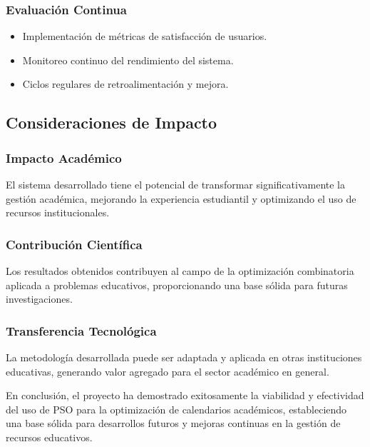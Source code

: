 \subsubsection{Evaluación Continua}
\begin{itemize}
    \item Implementación de métricas de satisfacción de usuarios.
    \item Monitoreo continuo del rendimiento del sistema.
    \item Ciclos regulares de retroalimentación y mejora.
\end{itemize}

\subsection{Consideraciones de Impacto}

\subsubsection{Impacto Académico}
El sistema desarrollado tiene el potencial de transformar significativamente la gestión académica, mejorando la experiencia estudiantil y optimizando el uso de recursos institucionales.

\subsubsection{Contribución Científica}
Los resultados obtenidos contribuyen al campo de la optimización combinatoria aplicada a problemas educativos, proporcionando una base sólida para futuras investigaciones.

\subsubsection{Transferencia Tecnológica}
La metodología desarrollada puede ser adaptada y aplicada en otras instituciones educativas, generando valor agregado para el sector académico en general.

En conclusión, el proyecto ha demostrado exitosamente la viabilidad y efectividad del uso de PSO para la optimización de calendarios académicos, estableciendo una base sólida para desarrollos futuros y mejoras continuas en la gestión de recursos educativos.
